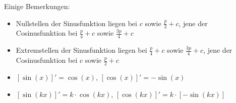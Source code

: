 Einige Bemerkungen:

\begin{itemize}
	\item Nullstellen der Sinusfunktion liegen bei $c$ sowie $\frac{p}{2} + c$, jene der Cosinusfunktion bei $\frac{p}{4} + c$ sowie $\frac{3p}{4} + c$

	\item Extremstellen der Sinusfunktion liegen bei $\frac{p}{4} + c$ sowie $\frac{3p}{4} + c$, jene der Cosinusfunktion bei $c$ sowie $\frac{p}{2} + c$
	
	\item $[\sin(x)]' = \cos(x)$, $[\cos(x)]' = -\sin(x)$

	\item $[\sin(kx)]' = k \cdot \cos(kx)$, $[\cos(kx)]' = k \cdot [-\sin(kx)]$
\end{itemize}

\begin{figure}[h!]
\end{figure}

